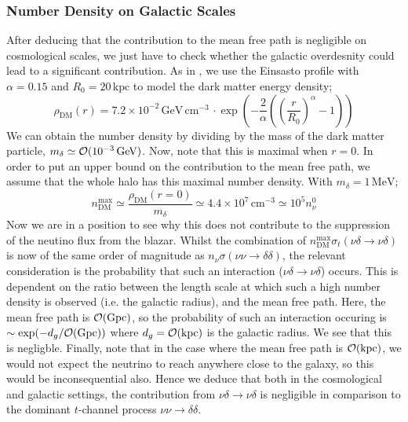 \documentclass[10pt]{article}
\begin{document}
\subsubsection{Number Density on Galactic Scales}
After deducing that the contribution to the mean free path is negligible on cosmological scales, we just have to check whether the galactic overdesnity could lead to a significant contribution. As in \cite{Franarin2018}, we use the Einsasto profile with $\alpha = 0.15$ and $R_0 = 20\,\textrm{kpc}$ to model the dark matter energy density;
\begin{equation}
  \rho_{\textrm{DM}}(r) = 7.2 \times 10^{-2}\,\textrm{GeV} \, \textrm{cm}^{-3}\, \cdot \exp\left(-\frac{2}{\alpha}\left(\left(\frac{r}{R_0}\right)^\alpha - 1\right)\right)
\end{equation}
We can obtain the number density by dividing by the mass of the dark matter particle, $m_\delta \simeq \mathcal{O}(10^{-3} \, \textrm{GeV})$. Now, note that this is maximal when $r = 0$. In order to put an upper bound on the contribution to the mean free path, we assume that the whole halo has this maximal number density. With $m_\delta = 1\, \textrm{MeV}$;
\begin{equation}
  n_{\textrm{DM}}^{\textrm{max}} \simeq \frac{\rho_{\textrm{DM}}(r = 0)}{m_\delta} \simeq 4.4 \times 10^{7} \, \textrm{cm}^{-3} \simeq 10^{5} n^0_{\nu}
\end{equation}
Now we are in a position to see why this does not contribute to the suppression of the neutino flux from the blazar. Whilst the combination of $n^{\textrm{max}}_{\textrm{DM}} \sigma_t(\nu\delta\rightarrow\nu\delta)$ is now of the same order of magnitude as $n_\nu \sigma(\nu\nu\rightarrow \delta\delta)$, the relevant consideration is the probability that such an interaction ($\nu\delta \rightarrow \nu\delta$) occurs. This is dependent on the ratio between the length scale at which such a high number density is observed (i.e. the galactic radius), and the mean free path. Here, the mean free path is $\mathcal{O}(\textrm{Gpc})$, so the probability of such an interaction occuring is $\sim \exp(-d_{g}/\mathcal{O}(\textrm{Gpc}))$ where $d_g = \mathcal{O}(\textrm{kpc})$ is the galactic radius. We see that this is negligble. Finally, note that in the case where the mean free path is $\mathcal{O}(\textrm{kpc})$, we would not expect the neutrino to reach anywhere close to the galaxy, so this would be inconsequential also. Hence we deduce that both in the cosmological and galactic settings, the contribution from $\nu\delta \rightarrow \nu\delta$ is negligible in comparison to the dominant $t$-channel process $\nu\nu \rightarrow \delta\delta$.
\end{document}
